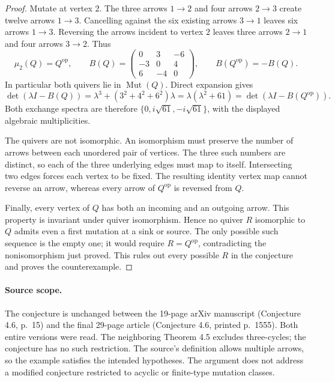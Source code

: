 \documentclass[11pt]{article}
\begin{document}
\begin{proof}
Mutate at vertex $2$. The three arrows $1\to2$ and four arrows
$2\to3$ create twelve arrows $1\to3$. Cancelling against the six
existing arrows $3\to1$ leaves six arrows $1\to3$. Reversing the
arrows incident to vertex $2$ leaves three arrows $2\to1$ and four
arrows $3\to2$. Thus
\[
\mu_2(Q)=Q^{\mathrm{op}},\qquad
B(Q)=\begin{pmatrix}0&3&-6\\-3&0&4\\6&-4&0\end{pmatrix},
\qquad B(Q^{\mathrm{op}})=-B(Q).
\]
In particular both quivers lie in $\operatorname{Mut}(Q)$.
Direct expansion gives
\[
\det(\lambda I-B(Q))
=\lambda^3+(3^2+4^2+6^2)\lambda
=\lambda(\lambda^2+61)
=\det(\lambda I-B(Q^{\mathrm{op}})).
\]
Both exchange spectra are therefore $\{0,i\sqrt{61},-i\sqrt{61}\}$,
with the displayed algebraic multiplicities.

The quivers are not isomorphic. An isomorphism must preserve the number
of arrows between each unordered pair of vertices. The three such
numbers are distinct, so each of the three underlying edges must map
to itself. Intersecting two edges forces each vertex to be fixed.
The resulting identity vertex map cannot reverse an arrow, whereas
every arrow of $Q^{\mathrm{op}}$ is reversed from $Q$.

Finally, every vertex of $Q$ has both an incoming and an outgoing
arrow. This property is invariant under quiver isomorphism. Hence
no quiver $R$ isomorphic to $Q$ admits even a first mutation at a
sink or source. The only possible such sequence is the empty one;
it would require $R=Q^{\mathrm{op}}$, contradicting the
nonisomorphism just proved. This rules out every possible $R$ in
the conjecture and proves the counterexample.
\end{proof}

\paragraph{Source scope.}
The conjecture is unchanged between the 19-page arXiv manuscript
(Conjecture 4.6, p.~15) and the final 29-page article
(Conjecture 4.6, printed p.~1555). Both entire versions were read.
The neighboring Theorem 4.5 excludes three-cycles; the conjecture
has no such restriction. The source's definition allows multiple
arrows, so the example satisfies the intended hypotheses. The
argument does not address a modified conjecture restricted to
acyclic or finite-type mutation classes.
\end{document}

